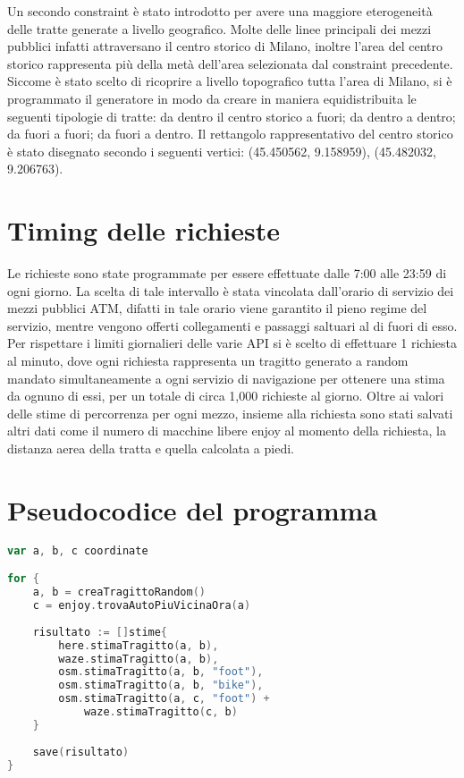 Un secondo constraint è stato introdotto per avere una maggiore eterogeneità delle tratte generate a livello geografico. Molte delle linee principali dei mezzi pubblici infatti attraversano il centro storico di Milano, inoltre l'area del centro storico rappresenta più della metà dell'area selezionata dal constraint precedente. Siccome è stato scelto di ricoprire a livello topografico tutta l'area di Milano, si è programmato il generatore in modo da creare in maniera equidistribuita le seguenti tipologie di tratte: da dentro il centro storico a fuori; da dentro a dentro; da fuori a fuori; da fuori a dentro. Il rettangolo rappresentativo del centro storico è stato disegnato secondo i seguenti vertici: (45.450562\textdegree, 9.158959\textdegree), (45.482032\textdegree, 9.206763\textdegree).

\section{Timing delle richieste}

Le richieste sono state programmate per essere effettuate dalle 7:00 alle 23:59 di ogni giorno. La scelta di tale intervallo è stata vincolata dall'orario di servizio dei mezzi pubblici ATM, difatti in tale orario viene garantito il pieno regime del servizio, mentre vengono offerti collegamenti e passaggi saltuari al di fuori di esso.
Per rispettare i limiti giornalieri delle varie API si è scelto di effettuare 1 richiesta al minuto, dove ogni richiesta rappresenta un tragitto generato a random mandato simultaneamente a ogni servizio di navigazione per ottenere una stima da ognuno di essi, per un totale di circa 1,000 richieste al giorno. Oltre ai valori delle stime di percorrenza per ogni mezzo, insieme alla richiesta sono stati salvati altri dati come il numero di macchine libere enjoy al momento della richiesta, la distanza aerea della tratta e quella calcolata a piedi. 

\section{Pseudocodice del programma}

\begin{lstlisting}[language=Go]
var a, b, c coordinate

for {
	a, b = creaTragittoRandom()
	c = enjoy.trovaAutoPiuVicinaOra(a)
	
	risultato := []stime{
		here.stimaTragitto(a, b),
		waze.stimaTragitto(a, b),
		osm.stimaTragitto(a, b, "foot"),
		osm.stimaTragitto(a, b, "bike"),
		osm.stimaTragitto(a, c, "foot") +
			waze.stimaTragitto(c, b)
	}
	
	save(risultato)
}
\end{lstlisting}